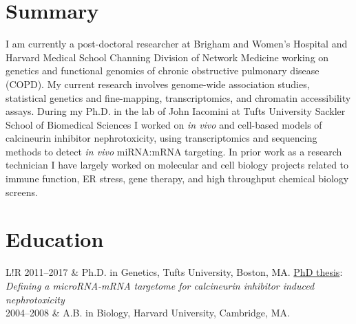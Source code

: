\documentclass[letterpaper, 10pt]{article}
\newcommand\VRule{\color{lightgray}\vrule width 0.5pt}
\begin{document}
\section*{Summary}

I am currently a post-doctoral researcher at Brigham and Women's Hospital and Harvard Medical School Channing Division of Network Medicine working on genetics and functional genomics of chronic obstructive pulmonary disease (COPD). My current research involves genome-wide association studies, statistical genetics and fine-mapping, transcriptomics, and chromatin accessibility assays.  During my Ph.D. in the lab of John Iacomini at Tufts University Sackler School of Biomedical Sciences I worked on \textit{in vivo} and cell-based models of calcineurin inhibitor nephrotoxicity, using transcriptomics and sequencing methods to detect \textit{in vivo} miRNA:mRNA targeting. In prior work as a research technician I have largely worked on molecular and cell biology projects related to immune function, ER stress, gene therapy, and high throughput chemical biology screens. 

\section*{Education}
\begin{tabular}{L!{\VRule}R}
   2011--2017 & Ph.D. in Genetics, Tufts University, Boston, MA. \href{https://github.com/cbenway/cv/blob/master/phd_thesis.pdf}{PhD thesis}: \textit{Defining a microRNA-mRNA targetome for calcineurin inhibitor induced nephrotoxicity}\\
   2004--2008 & A.B. in Biology, Harvard University, Cambridge, MA.
\end{tabular}
\end{document}
